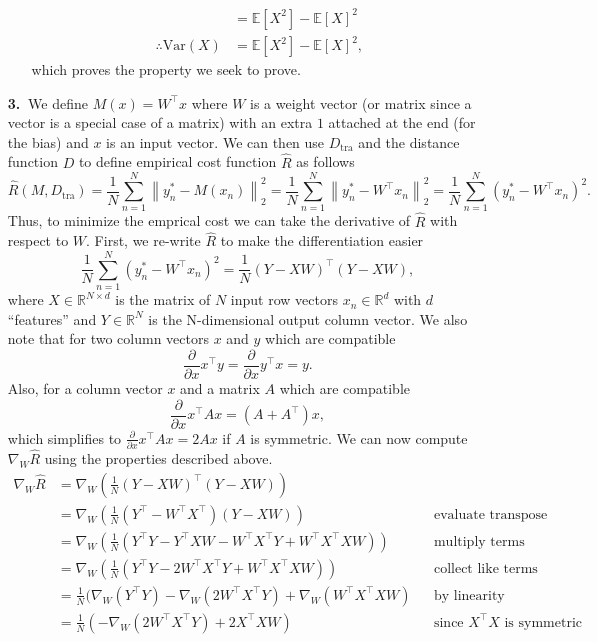 \documentclass [10pt]{article}
\newcommand{\norm}[1]{\left\lVert#1\right\rVert}
\begin{document}
\begin{enumerate}
\begin{enumerate}
\begin{align}
			&=\mathbb{E}[X^{2}]-\mathbb{E}[X]^{2}\nonumber\\
			\therefore\text{Var}(X)&=\mathbb{E}[X^{2}]-\mathbb{E}[X]^{2},\nonumber
		\end{align}
		which proves the property we seek to prove.
	\end{enumerate}
	\newpage
	\item[\textbf{3.$\>$}]
	We define $M(x) = W^{\top}x$ where $W$ is a weight vector (or matrix since a vector is a special case of a matrix) with an extra $1$ attached at the end (for the bias) and $x$ is an input vector. We can then use $D_{\text{tra}}$ and the distance function $D$ to define empirical cost function $\hat{R}$ as follows$$\hat{R}(M,D_{\text{tra}})=\frac{1}{N}\sum_{n=1}^{N}\norm{y_{n}^{*}-M(x_{n})}^{2}_{2}=\frac{1}{N}\sum_{n=1}^{N}\norm{y_{n}^{*}-W^{\top}x_{n}}^{2}_{2}=\frac{1}{N}\sum_{n=1}^{N}(y_{n}^{*}-W^{\top}x_{n})^{2}.$$Thus, to minimize the emprical cost we can take the derivative of $\hat{R}$ with respect to $W$. First, we re-write $\hat{R}$ to make the differentiation easier $$\frac{1}{N}\sum_{n=1}^{N}(y_{n}^{*}-W^{\top}x_{n})^{2}=\frac{1}{N}(Y-XW)^{\top}(Y-XW),$$where $X\in\mathbb{R}^{N\times d}$ is the matrix of $N$ input row vectors $x_{n}\in\mathbb{R}^{d}$ with $d$ ``features'' and $Y\in\mathbb{R}^{N}$ is the N-dimensional output column vector. We also note that for two column vectors $x$ and $y$ which are compatible$$\frac{\partial}{\partial x}x^{\top}y=\frac{\partial}{\partial x}y^{\top}x=y.$$Also, for a column vector $x$ and a matrix $A$ which are compatible$$\frac{\partial}{\partial x}x^{\top}Ax=(A+A^{\top})x,$$which simplifies to $\frac{\partial}{\partial x}x^{\top}Ax=2Ax$ if $A$ is symmetric. We can now compute $\nabla_{W}\hat{R}$ using the properties described above.
	\begin{align}
		\nabla_{W}\hat{R}&=\nabla_{W}(\frac{1}{N}(Y-XW)^{\top}(Y-XW))\nonumber\\
		&=\nabla_{W}(\frac{1}{N}(Y^{\top}-W^{\top}X^{\top})(Y-XW))&&\text{evaluate transpose}\nonumber\\
		&=\nabla_{W}(\frac{1}{N}(Y^{\top}Y-Y^{\top}XW-W^{\top}X^{\top}Y+W^{\top}X^{\top}XW))&&\text{multiply terms}\nonumber\\
		&=\nabla_{W}(\frac{1}{N}(Y^{\top}Y-2W^{\top}X^{\top}Y+W^{\top}X^{\top}XW))&&\text{collect like terms}\nonumber\\
		&=\frac{1}{N}(\nabla_{W}(Y^{\top}Y)-\nabla_{W}(2W^{\top}X^{\top}Y)+\nabla_{W}(W^{\top}X^{\top}XW)&&\text{by linearity}\nonumber\\
		&=\frac{1}{N}(-\nabla_{W}(2W^{\top}X^{\top}Y)+2X^{\top}XW)&&\text{since $X^{\top}X$ is symmetric}\nonumber\\

\end{align}
\end{enumerate}
\end{document}
